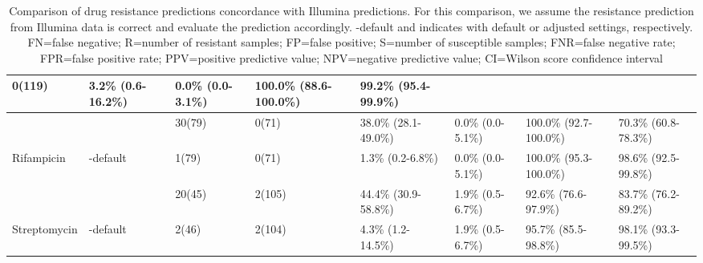 \begin{table}
{\begin{tabular}{|l|l|l|l|l|l|l|l|}
  \cellcolor[HTML]{EFEFEF}0(119) &
  \cellcolor[HTML]{EFEFEF}3.2\% (0.6-16.2\%) &
  \cellcolor[HTML]{EFEFEF}0.0\% (0.0-3.1\%) &
  \cellcolor[HTML]{EFEFEF}100.0\% (88.6-100.0\%) &
  \cellcolor[HTML]{EFEFEF}99.2\% (95.4-99.9\%) \\ \hline
 &
  \mykrobe{} &
  30(79) &
  0(71) &
  38.0\% (28.1-49.0\%) &
  0.0\% (0.0-5.1\%) &
  100.0\% (92.7-100.0\%) &
  70.3\% (60.8-78.3\%) \\ \cline{2-8} 
\multirow{-2}{*}{Rifampicin} &
  \cellcolor[HTML]{EFEFEF}\mykrobe{}-default &
  \cellcolor[HTML]{EFEFEF}1(79) &
  \cellcolor[HTML]{EFEFEF}0(71) &
  \cellcolor[HTML]{EFEFEF}1.3\% (0.2-6.8\%) &
  \cellcolor[HTML]{EFEFEF}0.0\% (0.0-5.1\%) &
  \cellcolor[HTML]{EFEFEF}100.0\% (95.3-100.0\%) &
  \cellcolor[HTML]{EFEFEF}98.6\% (92.5-99.8\%) \\ \hline
 &
  \mykrobe{} &
  20(45) &
  2(105) &
  44.4\% (30.9-58.8\%) &
  1.9\% (0.5-6.7\%) &
  92.6\% (76.6-97.9\%) &
  83.7\% (76.2-89.2\%) \\ \cline{2-8} 
\multirow{-2}{*}{Streptomycin} &
  \cellcolor[HTML]{EFEFEF}\mykrobe{}-default &
  \cellcolor[HTML]{EFEFEF}2(46) &
  \cellcolor[HTML]{EFEFEF}2(104) &
  \cellcolor[HTML]{EFEFEF}4.3\% (1.2-14.5\%) &
  \cellcolor[HTML]{EFEFEF}1.9\% (0.5-6.7\%) &
  \cellcolor[HTML]{EFEFEF}95.7\% (85.5-98.8\%) &
  \cellcolor[HTML]{EFEFEF}98.1\% (93.3-99.5\%) \\ \hline
\end{tabular}%
}
\caption{Comparison of \ont{} drug resistance predictions concordance with Illumina predictions. For this comparison, we assume the \mykrobe{} resistance prediction from Illumina data is correct and evaluate the \ont{} prediction accordingly. \mykrobe{}-default and \mykrobe{} indicates \mykrobe{} with default or adjusted settings, respectively. FN=false negative; R=number of resistant samples; FP=false positive; S=number of susceptible samples; FNR=false negative rate; FPR=false positive rate; PPV=positive predictive value; NPV=negative predictive value; CI=Wilson score confidence interval}
\label{tab:mykrobe-settings-geno}
\end{table}
